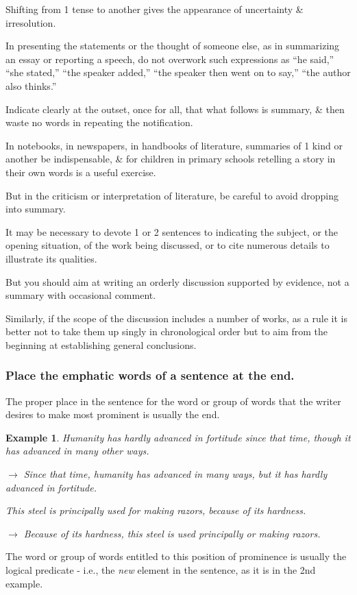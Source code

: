 \documentclass{article}
\newtheorem{example}{Example}
\begin{document}
Shifting from 1 tense to another gives the appearance of uncertainty \& irresolution.

%
In presenting the statements or the thought of someone else, as in summarizing an essay or reporting a speech, do not overwork such expressions as ``he said,'' ``she stated,'' ``the speaker added,'' ``the speaker then went on to say,'' ``the author also thinks.''

Indicate clearly at the outset, once for all, that what follows is summary, \& then waste no words in repeating the notification.

%
In notebooks, in newspapers, in handbooks of literature, summaries of 1 kind or another be indispensable, \& for children in primary schools retelling a story in their own words is a useful exercise.

But in the criticism or interpretation of literature, be careful to avoid dropping into summary.

It may be necessary to devote 1 or 2 sentences to indicating the subject, or the opening situation, of the work being discussed, or to cite numerous details to illustrate its qualities.

But you should aim at writing an orderly discussion supported by evidence, not a summary with occasional comment.

Similarly, if the scope of the discussion includes a number of works, as a rule it is better not to take them up singly in chronological order but to aim from the beginning at establishing general conclusions.


\subsubsection{Place the emphatic words of a sentence at the end.}
The proper place in the sentence for the word or group of words that the writer desires to make most prominent is usually the end.
\begin{example}
	Humanity has hardly advanced in fortitude since that time, though it has advanced in many other ways.
	
	$\to$ Since that time, humanity has advanced in many ways, but it has hardly advanced in fortitude.
	
	This steel is principally used for making razors, because of its hardness.
	
	$\to$ Because of its hardness, this steel is used principally or making razors.
\end{example}
The word or group of words entitled to this position of prominence is usually the logical predicate - i.e., the {\it new} element in the sentence, as it is in the 2nd example.
\end{document}
